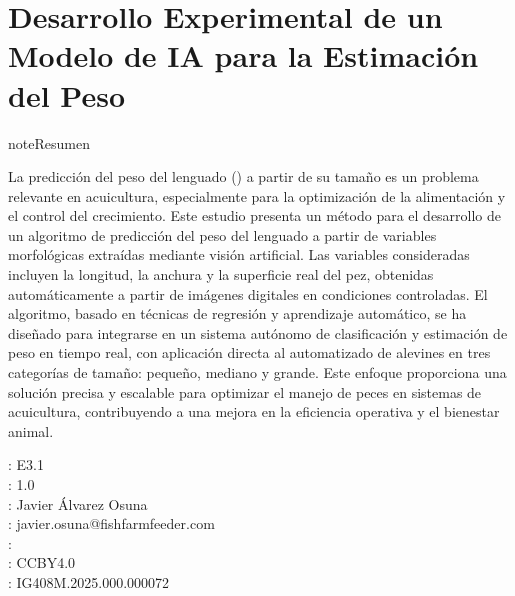 \documentclass[a4paper,10pt,spanish]{jupyterBook}
\begin{document}
\chapter{Desarrollo Experimental de un Modelo de IA para la Estimación del Peso}
\label{\detokenize{content/03/Peso:desarrollo-experimental-de-un-modelo-de-ia-para-la-estimacion-del-peso}}\label{\detokenize{content/03/Peso::doc}}
\begin{sphinxadmonition}{note}{Resumen}

\sphinxAtStartPar
La predicción del peso del lenguado () a partir de su tamaño es un problema relevante en acuicultura, especialmente para la optimización de la alimentación y el control del crecimiento. Este estudio presenta un método para el desarrollo de un algoritmo de predicción del peso del lenguado a partir de variables morfológicas extraídas mediante visión artificial. Las variables consideradas incluyen la longitud, la anchura y la superficie real del pez, obtenidas automáticamente a partir de imágenes digitales en condiciones controladas. El algoritmo, basado en técnicas de regresión y aprendizaje automático, se ha diseñado para integrarse en un sistema autónomo de clasificación y estimación de peso en tiempo real, con aplicación directa al  automatizado de alevines en tres categorías de tamaño: pequeño, mediano y grande. Este enfoque proporciona una solución precisa y escalable para optimizar el manejo de peces en sistemas de acuicultura, contribuyendo a una mejora en la eficiencia operativa y el bienestar animal.

\sphinxAtStartPar
{}: E3.1\\
: 1.0\\
: Javier Álvarez Osuna\\
: javier.osuna@fishfarmfeeder.com\\
: \\
: CC\sphinxhyphen{}BY\sphinxhyphen{}4.0\\
: IG408M.2025.000.000072

\begin{figure}[H]
\centering

\noindent{}
\end{figure}
\end{sphinxadmonition}
\end{document}
